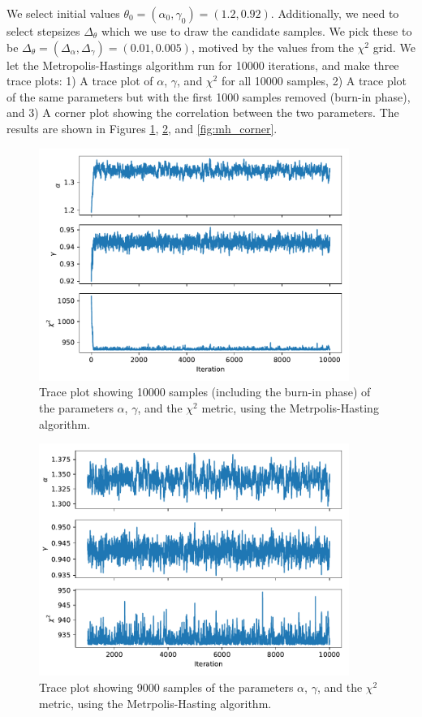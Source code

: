 \documentclass{article}
\begin{document}
We select initial values $\theta_0 = (\alpha_0, \gamma_0) = (1.2, 0.92)$. Additionally, we need to select stepsizes $\Delta_\theta$ which we use to draw the candidate samples. We pick these to be $\Delta_\theta = (\Delta_\alpha, \Delta_\gamma) = (0.01, 0.005)$, motived by the values from the $\chi^2$ grid. We let the Metropolis-Hastings algorithm run for 10000 iterations, and make three trace plots: 1) A trace plot of $\alpha$, $\gamma$, and $\chi^2$ for all 10000 samples, 2) A trace plot of the same parameters but with the first 1000 samples removed (burn-in phase), and 3) A corner plot showing the correlation between the two parameters. The results are shown in Figures \ref{fig:mh}, \ref{fig:mh_burnin}, and \ref{fig:mh_corner}.
\begin{figure}
    \centering
    \includegraphics[width=0.9\textwidth]{figs/mh.pdf}
    \caption{Trace plot showing 10000 samples (including the burn-in phase) of the parameters $\alpha$, $\gamma$, and the $\chi^2$ metric, using the Metrpolis-Hasting algorithm.}
    \label{fig:mh}
\end{figure}
\begin{figure}
    \centering
    \includegraphics[width=0.9\textwidth]{figs/mh_postburnin.pdf}
    \caption{Trace plot showing 9000 samples of the parameters $\alpha$, $\gamma$, and the $\chi^2$ metric, using the Metrpolis-Hasting algorithm.}
    \label{fig:mh_burnin}
\end{figure}
\end{document}
